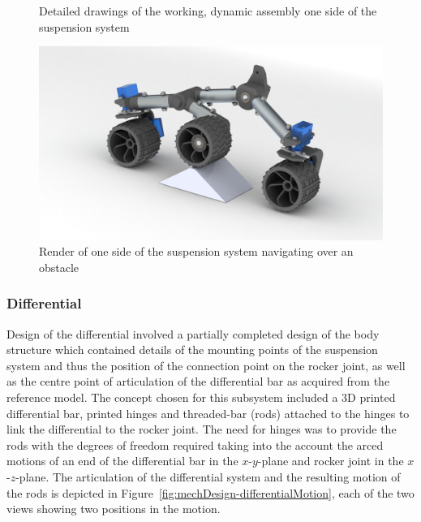 \begin{figure}[h!]
{      }
      \caption[Detailed drawings of the working, dynamic assembly one side of the suspension system]{Detailed drawings of the working, dynamic assembly one side of the suspension system}
      \label{fig:mechDesign-suspensionSubDetail}
      \end{figure}
      
      \begin{figure}[h!]
        \centering
        \includegraphics[width=1\linewidth]{figures/suspensionSub-obstacle}
        \caption[Render of one side of the suspension system navigating over an obstacle]{Render of one side of the suspension system navigating over an obstacle}
        \label{fig:mechDesign-suspensionSubObstacle}
      \end{figure}
      
    \subsubsection{Differential}
      Design of the differential involved a partially completed design of the body structure which contained details of the mounting points of the suspension system and thus the position of the connection point on the rocker joint, as well as the centre point of articulation of the differential bar as acquired from the reference model. The concept chosen for this subsystem included a 3D printed differential bar, printed hinges and threaded-bar (rods) attached to the hinges to link the differential to the rocker joint. The need for hinges was to provide the rods with the degrees of freedom required taking into the account the arced motions of an end of the differential bar in the $x$-$y$-plane and rocker joint in the $x$-$z$-plane. The articulation of the differential system and the resulting motion of the rods is depicted in Figure~\ref{fig:mechDesign-differentialMotion}, each of the two views showing two positions in the motion.
      
